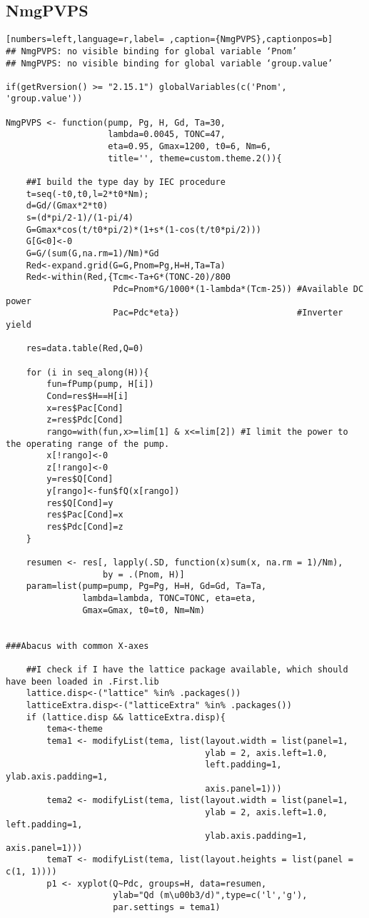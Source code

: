 \subsection{NmgPVPS}
\label{sec:orgd9ef1f9}
\label{subsec:nmgpvps}
\begin{lstlisting}[numbers=left,language=r,label= ,caption={NmgPVPS},captionpos=b]
## NmgPVPS: no visible binding for global variable ‘Pnom’
## NmgPVPS: no visible binding for global variable ‘group.value’

if(getRversion() >= "2.15.1") globalVariables(c('Pnom', 'group.value'))

NmgPVPS <- function(pump, Pg, H, Gd, Ta=30,
                    lambda=0.0045, TONC=47,
                    eta=0.95, Gmax=1200, t0=6, Nm=6,
                    title='', theme=custom.theme.2()){

    ##I build the type day by IEC procedure
    t=seq(-t0,t0,l=2*t0*Nm);
    d=Gd/(Gmax*2*t0)
    s=(d*pi/2-1)/(1-pi/4)
    G=Gmax*cos(t/t0*pi/2)*(1+s*(1-cos(t/t0*pi/2)))
    G[G<0]<-0
    G=G/(sum(G,na.rm=1)/Nm)*Gd
    Red<-expand.grid(G=G,Pnom=Pg,H=H,Ta=Ta)
    Red<-within(Red,{Tcm<-Ta+G*(TONC-20)/800
                     Pdc=Pnom*G/1000*(1-lambda*(Tcm-25)) #Available DC power
                     Pac=Pdc*eta})                       #Inverter yield

    res=data.table(Red,Q=0)

    for (i in seq_along(H)){
        fun=fPump(pump, H[i])
        Cond=res$H==H[i]
        x=res$Pac[Cond]
        z=res$Pdc[Cond]
        rango=with(fun,x>=lim[1] & x<=lim[2]) #I limit the power to the operating range of the pump.
        x[!rango]<-0
        z[!rango]<-0
        y=res$Q[Cond]
        y[rango]<-fun$fQ(x[rango])
        res$Q[Cond]=y
        res$Pac[Cond]=x
        res$Pdc[Cond]=z
    }

    resumen <- res[, lapply(.SD, function(x)sum(x, na.rm = 1)/Nm),
                   by = .(Pnom, H)]
    param=list(pump=pump, Pg=Pg, H=H, Gd=Gd, Ta=Ta,
               lambda=lambda, TONC=TONC, eta=eta,
               Gmax=Gmax, t0=t0, Nm=Nm)


###Abacus with common X-axes

    ##I check if I have the lattice package available, which should have been loaded in .First.lib
    lattice.disp<-("lattice" %in% .packages())
    latticeExtra.disp<-("latticeExtra" %in% .packages())
    if (lattice.disp && latticeExtra.disp){
        tema<-theme
        tema1 <- modifyList(tema, list(layout.width = list(panel=1,
                                       ylab = 2, axis.left=1.0,
                                       left.padding=1, ylab.axis.padding=1,
                                       axis.panel=1)))
        tema2 <- modifyList(tema, list(layout.width = list(panel=1,
                                       ylab = 2, axis.left=1.0, left.padding=1,
                                       ylab.axis.padding=1, axis.panel=1)))
        temaT <- modifyList(tema, list(layout.heights = list(panel = c(1, 1))))
        p1 <- xyplot(Q~Pdc, groups=H, data=resumen,
                     ylab="Qd (m\u00b3/d)",type=c('l','g'),
                     par.settings = tema1)


\end{lstlisting}
